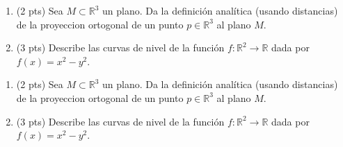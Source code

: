 \documentclass[12pt]{article}
\begin{document}
\bigskip

            
\bigskip
\bigskip
\bigskip


\begin{enumerate}

\item (2 pts) Sea $M\subset \mathbb{R}^3$ un plano. Da la definici\'on anal\'itica (usando distancias) de la proyeccion
  ortogonal de un punto $p\in \mathbb{R}^3$ al plano $M$. 
\vspace{3cm}
  
\item (3 pts) Describe las curvas de nivel de la funci\'on $f:\mathbb{R}^2\to \mathbb{R}$ dada por $f(x)=x^2-y^2$.



  \end{enumerate}


  \vspace{3cm}

\bigskip

            
\bigskip
\bigskip
\bigskip


\begin{enumerate}

\item (2 pts) Sea $M\subset \mathbb{R}^3$ un plano. Da la definici\'on anal\'itica (usando distancias) de la proyeccion
  ortogonal de un punto $p\in \mathbb{R}^3$ al plano $M$. 
\vspace{3cm}
  
\item (3 pts) Describe las curvas de nivel de la funci\'on $f:\mathbb{R}^2\to \mathbb{R}$ dada por $f(x)=x^2-y^2$.



  \end{enumerate}

  
  
\end{document}
